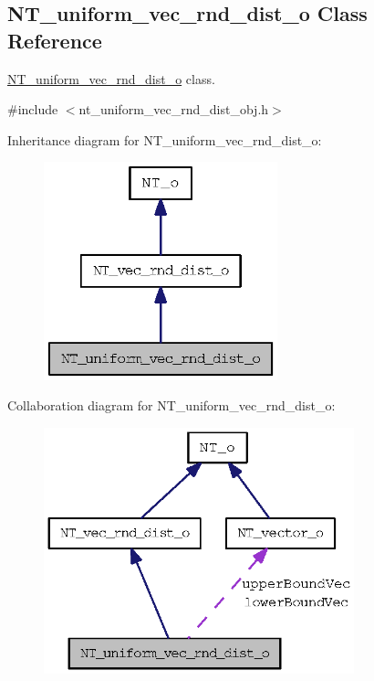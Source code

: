 \subsection{NT\_\-uniform\_\-vec\_\-rnd\_\-dist\_\-o Class Reference}
\label{class_n_t__uniform__vec__rnd__dist__o}


\hyperlink{class_n_t__uniform__vec__rnd__dist__o}{NT\_\-uniform\_\-vec\_\-rnd\_\-dist\_\-o} class.  




{\ttfamily \#include $<$nt\_\-uniform\_\-vec\_\-rnd\_\-dist\_\-obj.h$>$}



Inheritance diagram for NT\_\-uniform\_\-vec\_\-rnd\_\-dist\_\-o:
\nopagebreak
\begin{figure}[H]
\begin{center}
\leavevmode
\includegraphics[width=192pt]{class_n_t__uniform__vec__rnd__dist__o__inherit__graph}
\end{center}
\end{figure}


Collaboration diagram for NT\_\-uniform\_\-vec\_\-rnd\_\-dist\_\-o:
\nopagebreak
\begin{figure}[H]
\begin{center}
\leavevmode
\includegraphics[width=255pt]{class_n_t__uniform__vec__rnd__dist__o__coll__graph}
\end{center}
\end{figure}
